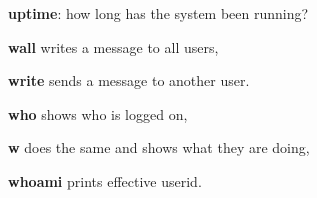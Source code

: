 \begin{enumx}
	\item [\cmd] \textbf{uptime}: how long has the system been running?
\end{enumx}

\begin{enumx}
	\item [\cmd] \textbf{wall} writes a message to all users,
	\item [\cmd] \textbf{write} sends a message to another user. 
\end{enumx}

\begin{enumx}
	\item [\cmd] \textbf{who} shows who is logged on,
	\item [\cmd] \textbf{w} does the same and shows what they are doing,
	\item [\cmd] \textbf{whoami} prints effective userid.
\end{enumx}

